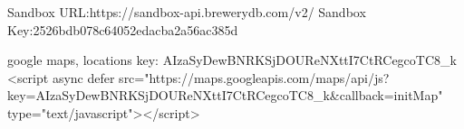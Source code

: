Sandbox URL:https://sandbox-api.brewerydb.com/v2/
Sandbox Key:2526bdb078c64052edacba2a56ac385d

google maps, locations key: AIzaSyDewBNRKSjDOUReNXttI7CtRCegcoTC8_k
 <script async defer src="https://maps.googleapis.com/maps/api/js?key=AIzaSyDewBNRKSjDOUReNXttI7CtRCegcoTC8_k&callback=initMap"
  type="text/javascript"></script>